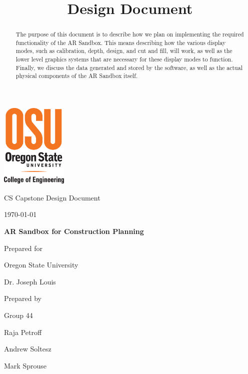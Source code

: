 \documentclass[onecolumn, draftclsnofoot,10pt, compsoc]{IEEEtran}
\title{Design Document}
\def \CapstoneTeamName{		Team Sandy}
\def \CapstoneTeamNumber{		44}
\def \GroupMemberOne{			Raja Petroff			}
\def \GroupMemberTwo{			Andrew Soltesz			}
\def \GroupMemberThree{			Mark Sprouse}
\def \CapstoneProjectName{		AR Sandbox for Construction Planning}
\def \CapstoneSponsorCompany{	Oregon State University}
\def \CapstoneSponsorPerson{		Dr. Joseph Louis}
\def \DocType{		%
				Design Document
				}
\newcommand{\NameSigPair}[1]{\par
\makebox[2.75in][r]{#1} \hfil 	\makebox[3.25in]{\makebox[2.25in]{\hrulefill} \hfill		\makebox[.75in]{\hrulefill}}
\par\vspace{-12pt} \textit{\tiny\noindent
\makebox[2.75in]{} \hfil		\makebox[3.25in]{\makebox[2.25in][r]{Signature} \hfill	\makebox[.75in][r]{Date}}}}
\renewcommand{\NameSigPair}[1]{#1}
\begin{document}
\begin{titlepage}
    \begin{singlespace}
    	\includegraphics[height=4cm]{coe_v_spot1}
        \hfill 
        \par\vspace{.2in}
        \centering
        \scshape{
            \huge CS Capstone \DocType \par
            {\large\today}\par
            \vspace{.5in}
            \textbf{\Huge\CapstoneProjectName}\par
            \vfill
            {\large Prepared for}\par
            \Huge \CapstoneSponsorCompany\par
            \vspace{5pt}
            {\Large\NameSigPair{\CapstoneSponsorPerson}\par}
            {\large Prepared by }\par
            Group\CapstoneTeamNumber\par
            \vspace{5pt}
            {\Large
                \NameSigPair{\GroupMemberOne}\par
                \NameSigPair{\GroupMemberTwo}\par
                \NameSigPair{\GroupMemberThree}\par
            }
            \vspace{20pt}
        }
        \begin{abstract}
      	The purpose of this document is to describe how we plan on implementing the required functionality of the AR Sandbox.
        This means describing how the various display modes, such as calibration, depth, design, and cut and fill, will work, as well as the lower level graphics systems that are necessary for these display modes to function.
        Finally, we discuss the data generated and stored by the software, as well as the actual physical components of the AR Sandbox itself.
        \end{abstract}     
    \end{singlespace}
\end{titlepage}
\newpage
{}
\tableofcontents
\listoffigures
\clearpage
\end{document}
